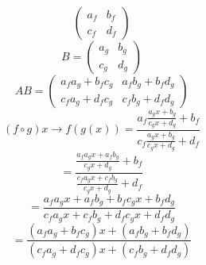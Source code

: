 \documentclass[a4paper,12pt]{article}
\begin{document}
\begin{enumerate}
$$\begin{pmatrix}
a_f & b_f\\
c_f & d_f
\end{pmatrix} $$
$$ B = \begin{pmatrix}
a_g & b_g\\
c_g & d_g
\end{pmatrix} $$
$$ AB = \begin{pmatrix}
a_fa_g+b_fc_g & a_fb_g+b_fd_g\\
c_fa_g+d_fc_g & c_fb_g+d_fd_g
\end{pmatrix} $$
$$(f\circ g)x \rightarrow f(g(x)) = \frac{a_f \frac{a_gx + b_g}{c_gx+d_g}+ b_f}{c_f \frac{a_gx + b_g}{c_gx+d_g} + d_f}$$
$$=\frac{\frac{a_fa_gx+a_fb_g}{c_gx+d_g}+ b_f}{\frac{c_fa_gx+c_fb_g}{c_gx+d_g}+ d_f} $$
$$=\frac{a_fa_gx+a_fb_g+b_fc_gx+b_fd_g}{c_fa_gx+c_fb_g+d_fc_gx+d_fd_g}$$
$$=\frac{(a_fa_g+b_fc_g)x+(a_fb_g+b_fd_g)}{(c_fa_g+d_fc_g)x + (c_fb_g+d_fd_g)}$$
\end{enumerate}

%

%
	
\end{document}
